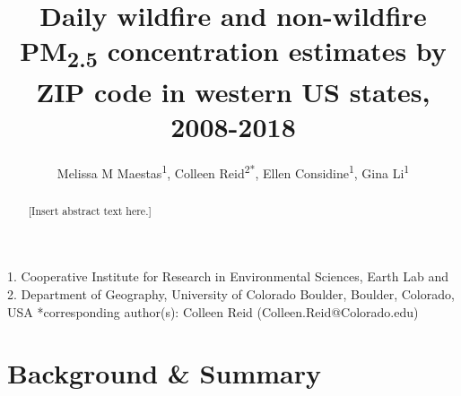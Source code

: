 \documentclass[english]{article}
\begin{document}
\title{Daily wildfire and non-wildfire PM\textsubscript{2.5} concentration estimates by ZIP code in western US states, 2008-2018} 

\author{Melissa M Maestas\textsuperscript{1}, 
Colleen Reid\textsuperscript{2{*}},
Ellen Considine\textsuperscript{1},
Gina Li\textsuperscript{1}}

\maketitle
\thispagestyle{fancy}

1. Cooperative Institute for Research in
Environmental Sciences, Earth Lab and %
2. Department of Geography, University of Colorado Boulder,
Boulder, Colorado, USA 
{*}corresponding author(s): Colleen Reid (Colleen.Reid@Colorado.edu)

\begin{abstract}

[Insert abstract text here.]

\end{abstract}

\section*{Background \& Summary}

\end{document}
